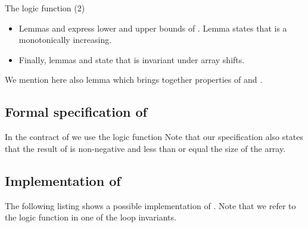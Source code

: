 \begin{logic}[hbt]
\begin{minipage}{\textwidth}

\end{minipage}
\caption{\label{logic:Count-2}The logic function \Count (2)}
\end{logic}

\FloatBarrier

\begin{itemize}
\item 
Lemmas  and 
express lower and upper bounds of \Count.
Lemma  states that \Count is a monotonically increasing.

\item
Finally, lemmas  and 
state that \Count is invariant under array shifts.
\end{itemize}

We mention here also lemma 
which brings together properties of  and .



\clearpage 

\subsection{Formal specification of \counti}

In the contract of  we use the logic function
Note that our specification also states that the result of \counti is non-negative
and less than or equal the size of the array.



\subsection{Implementation of \counti}

The following listing shows a possible implementation of .
Note that we refer to the logic function \Count in one of the loop invariants.



\clearpage

